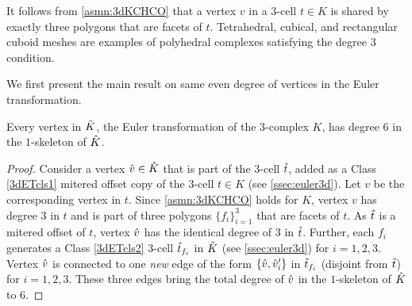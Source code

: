 It follows from \cref{asmn:3dKCHCO} that a vertex $v$ in a $3$-cell $t \in K$ is shared by exactly three polygons that are facets of $t$.
Tetrahedral,  cubical, and rectangular cuboid meshes are examples of polyhedral complexes satisfying the degree $3$ condition.

We first present the main result on same even degree of vertices in the Euler transformation.

\begin{thm} \label{thm:deg6ET3d}
  Every vertex in $\hat{K}$, the Euler transformation of the $3$-complex $K$, has degree $6$ in the $1$-skeleton of $\hat{K}$.
\end{thm}
\begin{proof}
  Consider a vertex $\hat{v} \in \hat{K}$ that is part of the $3$-cell $\hat{t}$, added as a Class \ref{3dETcls1} mitered offset copy of the $3$-cell $t \in K$ (see \cref{ssec:euler3d}).
  Let $v$ be the corresponding vertex in $t$.
  Since \cref{asmn:3dKCHCO} holds for $K$, vertex $v$ has degree $3$ in $t$ and is part of three polygons $\{f_i\}_{i=1}^3$ that are facets of $t$.
  As $\hat{t}$ is a mitered offset of $t$, vertex $\hat{v}$ has the identical degree of $3$ in $\hat{t}$.
  Further, each $f_i$ generates a Class \ref{3dETcls2} $3$-cell $\hat{t}_{f_i}$ in $\hat{K}$ (see \cref{ssec:euler3d}) for $i=1,2,3$.
  Vertex $\hat{v}$ is connected to one \emph{new} edge of the form  $\{\hat{v},\hat{v}'_i\}$ in $\hat{t}_{f_i}$ (disjoint from $\hat{t}$) for $i=1,2,3$.
  These three edges bring the total degree of $\hat{v}$ in the $1$-skeleton of $\hat{K}$ to $6$.
\end{proof}

